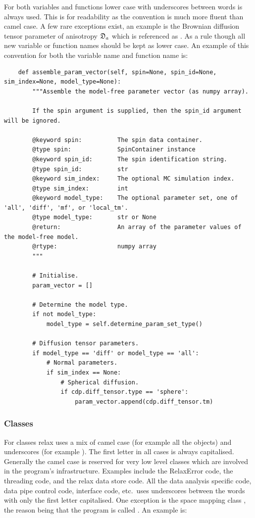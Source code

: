 For both variables and functions lower case with underscores between words is always used.
This is for readability as the convention is much more fluent than camel case.
A few rare exceptions exist, an example is the Brownian diffusion tensor parameter of anisotropy $\mathfrak{D}_a$ which is referenced as .
As a rule though all new variable or function names should be kept as lower case.
An example of this convention for both the variable name and function name is:

\begin{lstlisting}
    def assemble_param_vector(self, spin=None, spin_id=None, sim_index=None, model_type=None):
        """Assemble the model-free parameter vector (as numpy array).

        If the spin argument is supplied, then the spin_id argument will be ignored.

        @keyword spin:          The spin data container.
        @type spin:             SpinContainer instance
        @keyword spin_id:       The spin identification string.
        @type spin_id:          str
        @keyword sim_index:     The optional MC simulation index.
        @type sim_index:        int
        @keyword model_type:    The optional parameter set, one of 'all', 'diff', 'mf', or 'local_tm'. 
        @type model_type:       str or None
        @return:                An array of the parameter values of the model-free model.
        @rtype:                 numpy array
        """

        # Initialise.
        param_vector = []

        # Determine the model type.
        if not model_type:
            model_type = self.determine_param_set_type()

        # Diffusion tensor parameters.
        if model_type == 'diff' or model_type == 'all':
            # Normal parameters.
            if sim_index == None:
                # Spherical diffusion.
                if cdp.diff_tensor.type == 'sphere':
                    param_vector.append(cdp.diff_tensor.tm)
\end{lstlisting}



\subsubsection{Classes}

For classes relax uses a mix of camel case (for example all the  objects) and underscores (for example ).
The first letter in all cases is always capitalised.
Generally the camel case is reserved for very low level classes which are involved in the program's infrastructure.
Examples include the RelaxError code, the threading code, and the relax data store code.
All the data analysis specific code, data pipe control code, interface code, etc.\ uses underscores between the words with only the first letter capitalised.
One exception is the space mapping class , the reason being that the program is called .
An example is:

